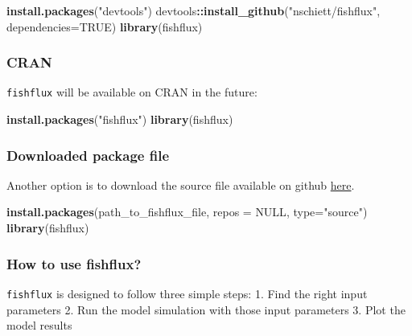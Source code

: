 \documentclass[]{article}
\newenvironment{Shaded}{\begin{snugshade}}{\end{snugshade}}
\newcommand{\DataTypeTok}[1]{\textcolor[rgb]{0.13,0.29,0.53}{#1}}
\newcommand{\KeywordTok}[1]{\textcolor[rgb]{0.13,0.29,0.53}{\textbf{#1}}}
\newcommand{\NormalTok}[1]{#1}
\newcommand{\OperatorTok}[1]{\textcolor[rgb]{0.81,0.36,0.00}{\textbf{#1}}}
\newcommand{\OtherTok}[1]{\textcolor[rgb]{0.56,0.35,0.01}{#1}}
\newcommand{\StringTok}[1]{\textcolor[rgb]{0.31,0.60,0.02}{#1}}
\begin{document}
\begin{Shaded}
\begin{Highlighting}[]
\KeywordTok{install.packages}\NormalTok{(}\StringTok{"devtools"}\NormalTok{)}
\NormalTok{devtools}\OperatorTok{::}\KeywordTok{install_github}\NormalTok{(}\StringTok{"nschiett/fishflux"}\NormalTok{, }\DataTypeTok{dependencies=}\OtherTok{TRUE}\NormalTok{)}
\KeywordTok{library}\NormalTok{(fishflux)}
\end{Highlighting}
\end{Shaded}

\hypertarget{cran}{%
\subsubsection{CRAN}\label{cran}}

\texttt{fishflux} will be available on CRAN in the future:

\begin{Shaded}
\begin{Highlighting}[]
\KeywordTok{install.packages}\NormalTok{(}\StringTok{"fishflux"}\NormalTok{)}
\KeywordTok{library}\NormalTok{(fishflux)}
\end{Highlighting}
\end{Shaded}

\hypertarget{downloaded-package-file}{%
\subsubsection{Downloaded package file}\label{downloaded-package-file}}

Another option is to download the source file available on github
\href{https://github.com/nschiett/fishflux}{here}.

\begin{Shaded}
\begin{Highlighting}[]
\KeywordTok{install.packages}\NormalTok{(path_to_fishflux_file, }\DataTypeTok{repos =} \OtherTok{NULL}\NormalTok{, }\DataTypeTok{type=}\StringTok{"source"}\NormalTok{)}
\KeywordTok{library}\NormalTok{(fishflux)}
\end{Highlighting}
\end{Shaded}

\hypertarget{how-to-use-fishflux}{%
\subsubsection{How to use fishflux?}\label{how-to-use-fishflux}}

\texttt{fishflux} is designed to follow three simple steps: 1. Find the
right input parameters 2. Run the model simulation with those input
parameters 3. Plot the model results
\end{document}
